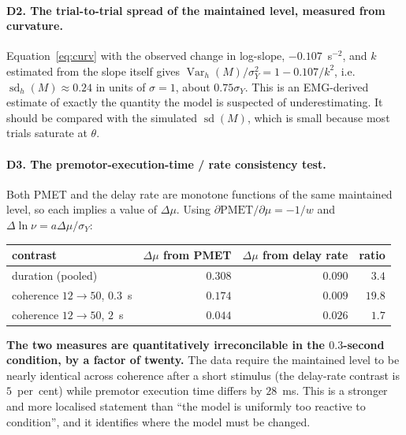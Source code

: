 \documentclass[11pt,a4paper]{article}
\newcommand{\Var}{\operatorname{Var}}
\newcommand{\Mrv}{M}
\theoremstyle{plain}
\theoremstyle{remark}
\begin{document}
\paragraph{D2. The trial-to-trial spread of the maintained level, measured from curvature.}
Equation~\eqref{eq:curv} with the observed change in log-slope, $-0.107$~s$^{-2}$, and
$k$ estimated from the slope itself gives
$\Var_h(\Mrv)/\sigma_Y^{2}=1-0.107/k^2$, i.e.\
$\operatorname{sd}_h(\Mrv)\approx0.24$ in units of $\sigma=1$, about $0.75\sigma_Y$. This
is an EMG-derived estimate of exactly the quantity the model is suspected of
underestimating. It should be compared with the simulated $\operatorname{sd}(\Mrv)$, which
is small because most trials saturate at $\theta$.

\paragraph{D3. The premotor-execution-time / rate consistency test.}
Both PMET and the delay rate are monotone functions of the same maintained level, so each
implies a value of $\Delta\mu$. Using $\partial\text{PMET}/\partial\mu=-1/w$ and
$\Delta\ln\nu=a\Delta\mu/\sigma_Y$:

\begin{center}
\begin{tabular}{lrrr}
\toprule
contrast & $\Delta\mu$ from PMET & $\Delta\mu$ from delay rate & ratio\\
\midrule
duration (pooled) & $0.308$ & $0.090$ & $3.4$\\
coherence $12\to50$, $0.3$~s & $0.174$ & $0.009$ & $19.8$\\
coherence $12\to50$, $2$~s & $0.044$ & $0.026$ & $1.7$\\
\bottomrule
\end{tabular}
\end{center}

\textbf{The two measures are quantitatively irreconcilable in the $0.3$-second condition,
by a factor of twenty.} The data require the maintained level to be nearly identical
across coherence after a short stimulus (the delay-rate contrast is $5$~per~cent) while
premotor execution time differs by $28$~ms. This is a stronger and more localised
statement than ``the model is uniformly too reactive to condition'', and it identifies
where the model must be changed.
\end{document}

